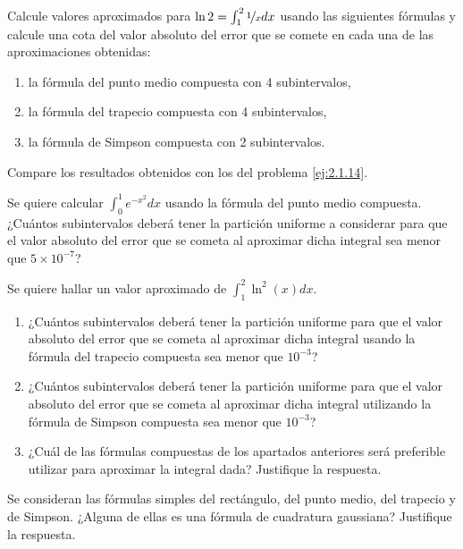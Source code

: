 \begin{ejercicio}\label{ej:2.1.18}
    Calcule valores aproximados para $\ln 2 = \int_{1}^{2} \nicefrac{1}{x} dx$ usando las siguientes fórmulas y calcule una cota del valor absoluto del error que se comete en cada una de las aproximaciones obtenidas:
    \begin{enumerate}
        \item la fórmula del punto medio compuesta con 4 subintervalos,
        \item la fórmula del trapecio compuesta con 4 subintervalos,
        \item la fórmula de Simpson compuesta con 2 subintervalos.
    \end{enumerate}
    
    Compare los resultados obtenidos con los del problema \ref{ej:2.1.14}.
\end{ejercicio}

\begin{ejercicio}\label{ej:2.1.19}
    Se quiere calcular $\int_{0}^{1} e^{-x^2} dx$ usando la fórmula del punto medio compuesta. ¿Cuántos subintervalos deberá tener la partición uniforme a considerar para que el valor absoluto del error que se cometa al aproximar dicha integral sea menor que $5 \times 10^{-7}$?
\end{ejercicio}

\begin{ejercicio}\label{ej:2.1.20}
    Se quiere hallar un valor aproximado de $\int_{1}^{2} \ln^2(x) dx$.
    \begin{enumerate}
        \item ¿Cuántos subintervalos deberá tener la partición uniforme para que el valor absoluto del error que se cometa al aproximar dicha integral usando la fórmula del trapecio compuesta sea menor que $10^{-3}$?
        \item ¿Cuántos subintervalos deberá tener la partición uniforme para que el valor absoluto del error que se cometa al aproximar dicha integral utilizando la fórmula de Simpson compuesta sea menor que $10^{-3}$?
        \item ¿Cuál de las fórmulas compuestas de los apartados anteriores será preferible utilizar para aproximar la integral dada? Justifique la respuesta.
    \end{enumerate}
\end{ejercicio}

\begin{ejercicio}\label{ej:2.1.21}
    Se consideran las fórmulas simples del rectángulo, del punto medio, del trapecio y de Simpson. ¿Alguna de ellas es una fórmula de cuadratura gaussiana? Justifique la respuesta.
\end{ejercicio}


